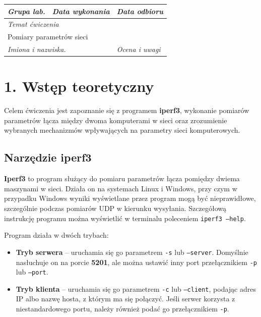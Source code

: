\documentclass[11pt,a4paper]{article}
\begin{document}
\noindent
\begin{tabular}{|p{2.6cm}|p{9.2cm}|p{4.3cm}|}
\hline
\textit{Grupa lab.} & \textit{Data wykonania} & \textit{Data odbioru} \\[0.7cm]
\hline
\multicolumn{3}{|l|}{\textit{Temat ćwiczenia}} \\
\multicolumn{3}{|l|}{Pomiary parametrów sieci} \\[0.3cm]
\hline
\multicolumn{2}{|l|}{\textit{Imiona i nazwiska.}} & \textit{Ocena i uwagi} \\[0.7cm]
\hline
\end{tabular}

\vspace{0.8cm}

\section*{1. Wstęp teoretyczny}

Celem ćwiczenia jest zapoznanie się z programem \textbf{iperf3}, wykonanie pomiarów parametrów łącza między dwoma komputerami w sieci oraz zrozumienie wybranych mechanizmów wpływających na parametry sieci komputerowych.

\subsection*{Narzędzie iperf3}

\textbf{Iperf3} to program służący do pomiaru parametrów łącza pomiędzy dwiema maszynami w sieci. Działa on na systemach Linux i Windows, przy czym w przypadku Windows wyniki wyświetlane przez program mogą być nieprawidłowe, szczególnie podczas pomiarów UDP w kierunku wysyłania. Szczegółową instrukcję programu można wyświetlić w terminalu poleceniem \texttt{iperf3 --help}.

Program działa w dwóch trybach:
\begin{itemize}
    \item \textbf{Tryb serwera} -- uruchamia się go parametrem \texttt{-s} lub \texttt{--server}. Domyślnie nasłuchuje on na porcie \textbf{5201}, ale można ustawić inny port przełącznikiem \texttt{-p} lub \texttt{--port}.
    \item \textbf{Tryb klienta} -- uruchamia się go parametrem \texttt{-c} lub \texttt{--client}, podając adres IP albo nazwę hosta, z którym ma się połączyć. Jeśli serwer korzysta z niestandardowego portu, należy również podać go przełącznikiem \texttt{-p}.
\end{itemize}
\end{document}

